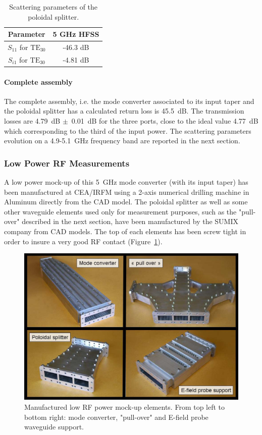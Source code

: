 {\begin{table}[h]
	\centering{}%
	\begin{tabular}{|c|c|}
		\hline 
		Parameter & 5 GHz HFSS\tabularnewline
		\hline 
		\hline 
		$S_{11}$ for $\mbox{TE}_{30}$ & -46.3 dB\tabularnewline
		\hline 
		$S_{i1}$ for $\mbox{TE}_{30}$ & -4.81 dB\tabularnewline
		\hline 
	\end{tabular}
	\caption{Scattering parameters of the poloidal splitter.}
	\label{tab:PoloidalSplitter_Sparameters}
\end{table}

\paragraph{Complete assembly}
The complete assembly, i.e. the mode converter associated to its input taper and the poloidal splitter has  a calculated return loss is 45.5~dB. The transmission losses are 4.79~dB $\pm$~0.01~dB for the three ports, close to the ideal value 4.77~dB which corresponding to the third of the input power. The scattering parameters evolution on a 4.9-5.1~GHz frequency band are reported in the next section.

\subsubsection{Low Power RF Measurements}
A low power mock-up of this 5~GHz mode converter (with its input taper) has been manufactured at CEA/IRFM using a 2-axis numerical drilling machine in Aluminum directly from the CAD model. The poloidal splitter as well as some other waveguide elements used only for measurement purposes, such as the "pull-over" described in the next section, have been manufactured by the SUMIX company from CAD models. The top of each elements has been screw tight in order to insure a very good RF contact (Figure~\ref{fig:ModeConverterMockUpElements}). 

\begin{figure}[h]
	\includegraphics[width=1.0\textwidth]{figures/chap3/ITER_modeconverter/LH4ITER_ModeConverterMockUpElements}
	\caption{Manufactured low RF power mock-up elements. From top left to bottom right: mode converter,  "pull-over" and E-field probe waveguide support. }
	\label{fig:ModeConverterMockUpElements}
\end{figure}

}
